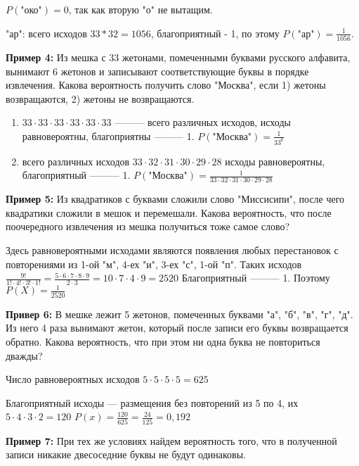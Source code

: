 \documentclass{article}
\begin{document}
    \(P(\textrm{"око"})=0\), так как вторую "о" не вытащим.

    "ар": всего исходов \(33*32=1056\), благоприятный - 1, по этому \(P(\textrm{"ар"})=\frac{1}{1056}\).

    \textbf{Пример 4:}
    Из мешка с 33 жетонами, помеченными буквами русского алфавита, вынимают 6 жетонов и записывают соответствующие буквы в порядке извлечения. Какова вероятность получить слово "Москва", если 1) жетоны возвращаются, 2) жетоны не возвращаются.
    \begin{enumerate}
    \item \(33 \cdot 33 \cdot 33 \cdot 33 \cdot 33 \cdot 33 \) ——— всего различных исходов, исходы равновероятны, благоприятны ——— 1. \(P(\textrm{"Москва"}) = \frac{1}{33^6}\)
    \item всего различных исходов \(33 \cdot 32 \cdot 31 \cdot 30 \cdot 29 \cdot 28 \) исходы равновероятны, благоприятный ——— 1. \(P(\textrm{"Москва"}) = \frac{1}{33 \cdot 32 \cdot 31 \cdot 30 \cdot 29 \cdot 28}\)
    \end{enumerate}

    \textbf{Пример 5:}
    Из квадратиков с буквами сложили слово "Миссисипи", после чего квадратики сложили в мешок и перемешали. 
    Какова вероятность, что после поочередного извлечения из мешка получиться тоже самое слово?

    Здесь равновероятными исходами являются появления любых перестановок с повторениями из 1-ой "м", 4-ех "и", 3-ех "с", 1-ой "п". 
    Таких исходов \( \frac{9!}{1! \cdot 4! \cdot 3! \cdot 1!} = \frac{5 \cdot 6 \cdot 7 \cdot 8 \cdot 9}{2 \cdot 3} = 10 \cdot 7 \cdot 4 \cdot 9 = 2520\)
    Благоприятный ——— 1. Поэтому \(P(X) = \frac{1}{2520}\)
    
    
    \textbf{Привер 6:}
    В мешке лежит 5 жетонов, помеченных буквами "а", "б", "в", "г", "д". 
    Из него 4 раза вынимают жетон, который после записи его буквы возвращается обратно. 
    Какова вероятность, что при этом ни одна буква не повториться дважды?

    Число равновероятных исходов \(5 \cdot 5 \cdot 5 \cdot 5 = 625\)
    
    Благоприятный исходы --- размещения без повторений из 5 по 4, их \(5 \cdot 4 \cdot 3 \cdot 2 = 120\)
    \(P(x)=\frac{120}{625} = \frac{24}{125} = 0,192\)

    
    \textbf{Пример 7:}
    При тех же условиях найдем вероятность того, что в полученной записи никакие двесоседние буквы не будут одинаковы. 
    
\end{document}
